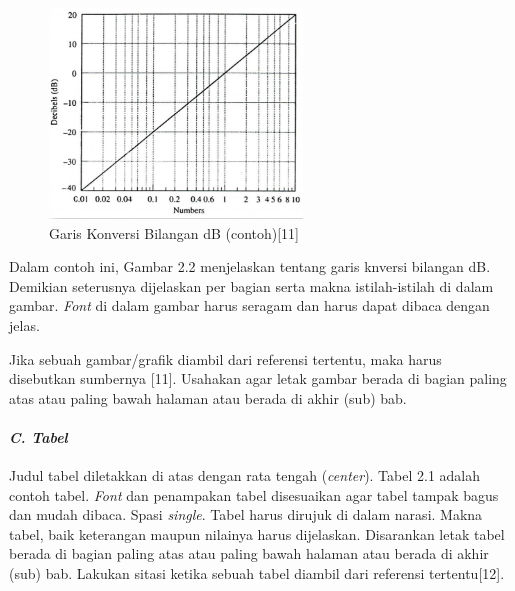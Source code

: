 \documentclass[12pt]{article}
\begin{document}
\begin{figure}[!ht]
\centering
 	\includegraphics[width=0.6\textwidth]{img-3.png}
 	\caption{Garis Konversi Bilangan dB (contoh)[11]}  
\end{figure}

Dalam contoh ini, Gambar 2.2 menjelaskan tentang garis knversi bilangan dB. Demikian seterusnya dijelaskan per bagian serta makna istilah-istilah di dalam gambar. \textit{Font} di dalam gambar harus seragam dan harus dapat dibaca dengan jelas. 

Jika sebuah gambar/grafik diambil dari referensi tertentu, maka harus disebutkan sumbernya [11]. Usahakan agar letak gambar berada di bagian paling atas atau paling bawah halaman atau berada di akhir (sub) bab.

\pagebreak


\paragraph{\textit{C. Tabel}}\mbox{}

Judul tabel diletakkan di atas dengan rata tengah (\textit{center}). Tabel 2.1 adalah contoh tabel. \textit{Font} dan penampakan tabel disesuaikan agar tabel tampak bagus dan mudah dibaca. Spasi \textit{single}. Tabel harus dirujuk di dalam narasi. Makna tabel, baik keterangan maupun nilainya harus dijelaskan. Disarankan letak tabel berada di bagian paling atas atau paling bawah halaman atau berada di akhir (sub) bab. Lakukan sitasi ketika sebuah tabel diambil dari referensi tertentu[12]. 
\end{document}
